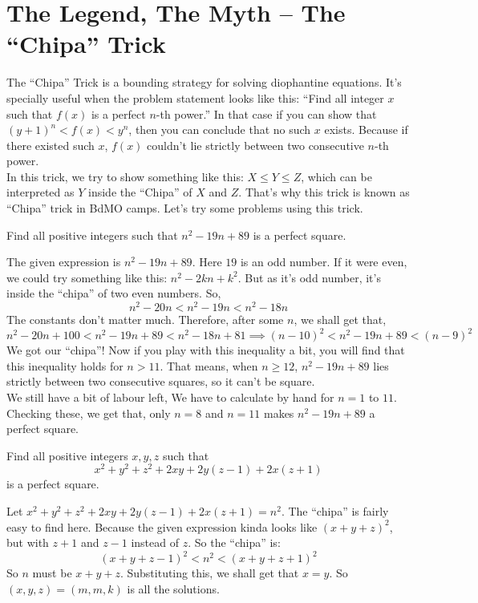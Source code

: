 \documentclass[11pt]{scrartcl}
\begin{document}
\section{The Legend, The Myth -- The ``Chipa'' Trick}
The ``Chipa'' Trick is a bounding strategy for solving diophantine equations. It's specially useful when the problem statement looks like this: ``Find all integer \(x\) such that \(f(x)\) is a perfect \(n\)-th power.'' In that case if you can show that \((y+1)^n < f(x) < y^n\), then you can conclude that no such \(x\) exists. Because if there existed such \(x\), \(f(x)\) couldn't lie strictly between two consecutive \(n\)-th power. \\
In this trick, we try to show something like this: \(X \leq Y \leq Z\), which can be interpreted as \(Y\) inside the ``Chipa'' of \(X\) and \(Z\). That's why this trick is known as ``Chipa'' trick in BdMO camps. Let's try some problems using this trick.
\begin{exercise}
Find all positive integers such that \(n^2 -19n +89\) is a perfect square.
\end{exercise}
\begin{soln}
The given expression is \(n^2 -19n +89\). Here \(19\) is an odd number. If it were even, we could try something like this: \(n^2 - 2kn + k^2\). But as it's odd number, it's inside the ``chipa'' of two even numbers. So, 
\[n^2 -20n < n^2 -19 n < n^2 - 18n\]
The constants don't matter much. Therefore, after some \(n\), we shall get that,
\[ n^2 -20n +100< n^2 -19 n + 89< n^2 - 18n + 81 \implies (n-10)^2 < n^2 -19n +89 < (n-9)^2\]
We got our ``chipa''! Now if you play with this inequality a bit, you will find that this inequality holds for \(n>11\). That means, when \(n\geq 12\), \(n^2 -19n +89 \) lies strictly between two consecutive squares, so it can't be square. \\
We still have a bit of labour left, We have to calculate by hand for \(n = 1\) to \(11\). Checking these, we get that, only \(n=8\) and \(n=11\) makes \(n^2 -19n +89\) a perfect square.
\end{soln}
\begin{exercise}
Find all positive integers \(x,y,z\) such that
\[x^2 + y^2 + z^2 + 2xy + 2y(z-1) + 2x(z+1)\]
is a perfect square.
\end{exercise}
\begin{soln}
Let \(x^2 + y^2 + z^2 + 2xy + 2y(z-1) + 2x(z+1) = n^2\). The ``chipa'' is fairly easy to find here. Because the given expression kinda looks like \((x+y+z)^2\), but with \(z+1\) and \(z-1\) instead of \(z\). So the ``chipa'' is:
\[(x+y+z-1)^2 < n^2 < (x+y+z+1)^2\]
So \(n\) must be \(x+y+z\). Substituting this, we shall get that \(x = y\). So \((x,y,z)=(m,m,k)\) is all the solutions.
\end{soln}
\end{document}
